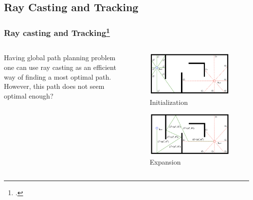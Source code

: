 \documentclass[
    11pt, %
    aspectratio=169, %
]{beamer}
\begin{document}
\subsection{Ray Casting and Tracking}

\begin{frame}
    \frametitle{Ray casting and Tracking\footcite{kimSimpleGlobalPath2018}}
    \begin{columns}[c]
        \begin{column}{0.5\textwidth}
            Having global path planning problem one can use ray casting as an efficient way of finding a most optimal path.
            \newline\newline
            However, this path does not seem optimal enough?
        \end{column}
        \begin{column}{0.5\textwidth}
            \begin{figure}
                \includegraphics[scale=0.23]{assets/rct-init.png}
                \caption{Initialization}
            \end{figure}
            \begin{figure}
                \includegraphics[scale=0.23]{assets/rct-expand.png}
                \caption{Expansion}
            \end{figure}
        \end{column}
    \end{columns}
\end{frame}
\end{document}
